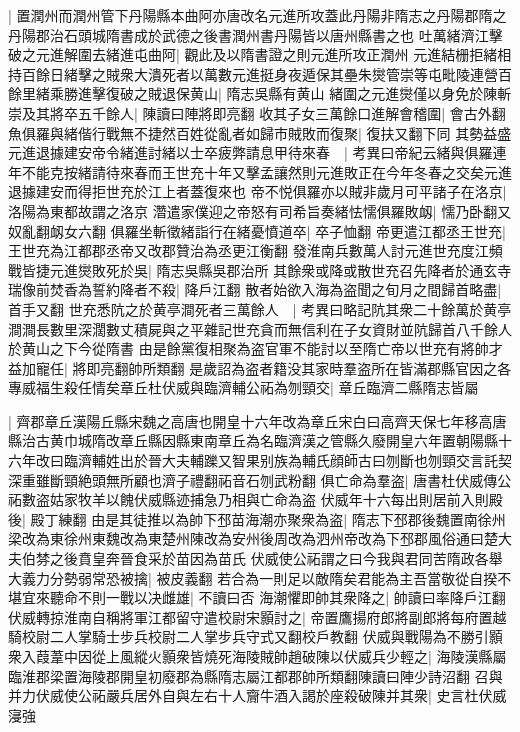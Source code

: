 |{
	置潤州而潤州管下丹陽縣本曲阿亦唐改名元進所攻蓋此丹陽非隋志之丹陽郡隋之丹陽郡治石頭城隋書成於武德之後書潤州書丹陽皆以唐州縣書之也}
吐萬緒濟江擊破之元進解圍去緒進屯曲阿|{
	觀此及以隋書證之則元進所攻正潤州}
元進結栅拒緒相持百餘日緒擊之賊衆大潰死者以萬數元進挺身夜遁保其壘朱爕管崇等屯毗陵連營百餘里緒乘勝進擊復破之賊退保黄山|{
	隋志吳縣有黄山}
緒圍之元進爕僅以身免於陳斬崇及其將卒五千餘人|{
	陳讀曰陣將即亮翻}
收其子女三萬餘口進解會稽圍|{
	會古外翻}
魚俱羅與緒偕行戰無不捷然百姓從亂者如歸市賊敗而復聚|{
	復扶又翻下同}
其勢益盛元進退據建安帝令緒進討緒以士卒疲弊請息甲待來春　|{
	考異曰帝紀云緒與俱羅連年不能克按緒請待來春而王世充十年又擊孟讓然則元進敗正在今年冬春之交矣元進退據建安而得拒世充於江上者蓋復來也}
帝不悦俱羅亦以賊非歲月可平諸子在洛京|{
	洛陽為東都故謂之洛京}
濳遣家僕迎之帝怒有司希旨奏緒怯懦俱羅敗衂|{
	懦乃卧翻又奴亂翻衂女六翻}
俱羅坐斬徵緒詣行在緒憂憤道卒|{
	卒子恤翻}
帝更遣江都丞王世充|{
	王世充為江都郡丞帝又改郡贊治為丞更江衡翻}
發淮南兵數萬人討元進世充度江頻戰皆捷元進爕敗死於吳|{
	隋志吳縣吳郡治所}
其餘衆或降或散世充召先降者於通玄寺瑞像前焚香為誓約降者不殺|{
	降戶江翻}
散者始欲入海為盗聞之旬月之間歸首略盡|{
	首手又翻}
世充悉阬之於黄亭澗死者三萬餘人　|{
	考異曰略記阬其衆二十餘萬於黄亭澗澗長數里深濶數丈積屍與之平雜記世充貪而無信利在子女資財並阬歸首八千餘人於黄山之下今從隋書}
由是餘黨復相聚為盗官軍不能討以至隋亡帝以世充有將帥才益加寵任|{
	將即亮翻帥所類翻}
是歲詔為盗者籍没其家時羣盗所在皆滿郡縣官因之各專威福生殺任情矣章丘杜伏威與臨濟輔公祏為刎頸交|{
	章丘臨濟二縣隋志皆屬}


|{
	齊郡章丘漢陽丘縣宋魏之高唐也開皇十六年改為章丘宋白曰高齊天保七年移高唐縣治古黄巾城隋改章丘縣因縣東南章丘為名臨濟漢之管縣久廢開皇六年置朝陽縣十六年改曰臨濟輔姓出於晉大夫輔躒又智果别族為輔氏顔師古曰刎斷也刎頸交言託契深重雖斷頸絶頭無所顧也濟子禮翻祏音石刎武粉翻}
俱亡命為羣盗|{
	唐書杜伏威傳公祏數盗姑家牧羊以餽伏威縣迹捕急乃相與亡命為盗}
伏威年十六每出則居前入則殿後|{
	殿丁練翻}
由是其徒推以為帥下邳苗海潮亦聚衆為盗|{
	隋志下邳郡後魏置南徐州梁改為東徐州東魏改為東楚州陳改為安州後周改為泗州帝改為下邳郡風俗通曰楚大夫伯棼之後賁皇奔晉食采於苗因為苗氏}
伏威使公祏謂之曰今我與君同苦隋政各舉大義力分勢弱常恐被擒|{
	被皮義翻}
若合為一則足以敵隋矣君能為主吾當敬從自揆不堪宜來聽命不則一戰以决雌雄|{
	不讀曰否}
海潮懼即帥其衆降之|{
	帥讀曰率降戶江翻}
伏威轉掠淮南自稱將軍江都留守遣校尉宋顥討之|{
	帝置鷹揚府郎將副郎將每府置越騎校尉二人掌騎士步兵校尉二人掌步兵守式又翻校戶教翻}
伏威與戰陽為不勝引顥衆入葭葦中因從上風縱火顥衆皆燒死海陵賊帥趙破陳以伏威兵少輕之|{
	海陵漢縣屬臨淮郡梁置海陵郡開皇初廢郡為縣隋志屬江都郡帥所類翻陳讀曰陣少詩沼翻}
召與并力伏威使公祏嚴兵居外自與左右十人齎牛酒入謁於座殺破陳并其衆|{
	史言杜伏威寖強}


